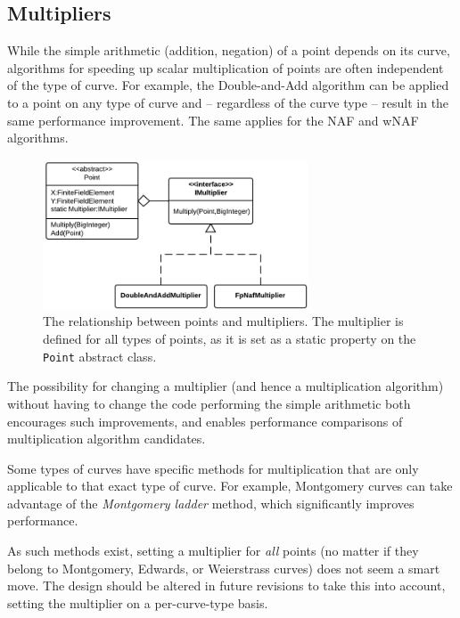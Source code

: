 \subsection{Multipliers}
\label{sec:implementation_multipliers}
\label{sec:implementation_multiplication}

While the simple arithmetic (addition, negation) of a point depends on its curve, algorithms for speeding up scalar
multiplication of points are often independent of the type of curve. For example, the Double-and-Add algorithm can be
applied to a point on any type of curve and -- regardless of the curve type -- result in the same performance improvement.
The same applies for the NAF and wNAF algorithms.

\begin{figure}[htb]
	\centering
	\includegraphics[width=0.7\textwidth]{implementation/multipliers}
	\caption{The relationship between points and multipliers. The multiplier is defined for all types of points, as it
		is set as a static property on the \texttt{Point} abstract class.}
\end{figure}

The possibility for changing a multiplier (and hence a multiplication algorithm) without having to change the code
performing the simple arithmetic both encourages such improvements, and enables performance comparisons of multiplication
algorithm candidates.

Some types of curves have specific methods for multiplication that are only applicable to that exact type of curve. For
example, Montgomery curves can take advantage of the \emph{Montgomery ladder} method, which significantly improves
performance.\cite{safecurves}

As such methods exist, setting a multiplier for \emph{all} points (no matter if they belong to Montgomery, Edwards, or
Weierstrass curves) does not seem a smart move. The design should be altered in future revisions to take this into account,
setting the multiplier on a per-curve-type basis.